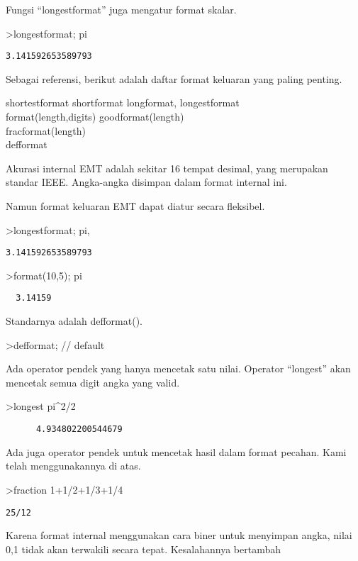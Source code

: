 \documentclass[
]{book}
\begin{document}
Fungsi ``longestformat'' juga mengatur format skalar.

\textgreater longestformat; pi

\begin{verbatim}
3.141592653589793
\end{verbatim}

Sebagai referensi, berikut adalah daftar format keluaran yang paling penting.

shortestformat shortformat longformat, longestformat\\
format(length,digits) goodformat(length)\\
fracformat(length)\\
defformat

Akurasi internal EMT adalah sekitar 16 tempat desimal, yang merupakan standar IEEE. Angka-angka disimpan dalam format internal ini.

Namun format keluaran EMT dapat diatur secara fleksibel.

\textgreater longestformat; pi,

\begin{verbatim}
3.141592653589793
\end{verbatim}

\textgreater format(10,5); pi

\begin{verbatim}
  3.14159 
\end{verbatim}

Standarnya adalah defformat().

\textgreater defformat; // default

Ada operator pendek yang hanya mencetak satu nilai. Operator ``longest'' akan mencetak semua digit angka yang valid.

\textgreater longest pi\^{}2/2

\begin{verbatim}
      4.934802200544679 
\end{verbatim}

Ada juga operator pendek untuk mencetak hasil dalam format pecahan. Kami telah menggunakannya di atas.

\textgreater fraction 1+1/2+1/3+1/4

\begin{verbatim}
25/12
\end{verbatim}

Karena format internal menggunakan cara biner untuk menyimpan angka, nilai 0,1 tidak akan terwakili secara tepat. Kesalahannya bertambah
\end{document}
